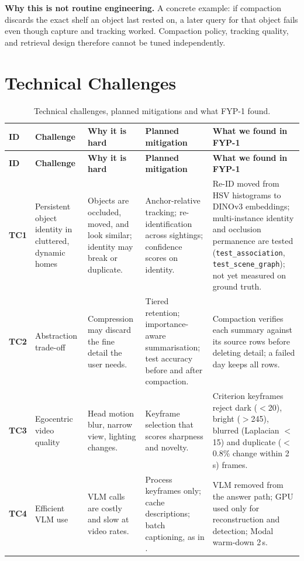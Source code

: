 \textbf{Why this is not routine engineering.} A concrete example: if compaction
discards the exact shelf an object last rested on, a later query for that
object fails even though capture and tracking worked. Compaction policy,
tracking quality, and retrieval design therefore cannot be tuned independently.
\section{Technical Challenges}
\begin{ltab}\scriptsize
\begin{longtable}{@{}>{\bfseries}L{0.9cm}L{2.3cm}L{3.7cm}L{3.7cm}L{3.7cm}@{}}
\caption{Technical challenges, planned mitigations and what FYP-1 found.}\label{tab:challenges}\\
\toprule
{}\textbf{ID} & \textbf{Challenge} & \textbf{Why it is hard} &
\textbf{Planned mitigation} & \textbf{What we found in FYP-1}\\
\midrule
\endfirsthead
\toprule
{}\textbf{ID} & \textbf{Challenge} & \textbf{Why it is hard} &
\textbf{Planned mitigation} & \textbf{What we found in FYP-1}\\
\midrule
\endhead
\bottomrule
\endfoot
TC1 & Persistent object identity in cluttered, dynamic homes & Objects are
occluded, moved, and look similar; identity may break or duplicate. &
Anchor-relative tracking; re-identification across sightings; confidence scores
on identity. & Re-ID moved from HSV histograms to DINOv3 embeddings; multi-instance identity and occlusion permanence are tested (\texttt{test\_association}, \texttt{test\_scene\_graph}); not yet measured on ground truth.\\
TC2 & Abstraction trade-off & Compression may discard the fine detail the user
needs. & Tiered retention; importance-aware summarisation; test accuracy
before and after compaction. & Compaction verifies each summary against its source rows before deleting detail; a failed day keeps all rows.\\
TC3 & Egocentric video quality & Head motion blur, narrow view, lighting
changes. & Keyframe selection that scores sharpness and novelty. & Criterion keyframes reject dark ($<$20), bright ($>$245), blurred (Laplacian $<$15) and duplicate ($<$0.8\% change within 2\,s) frames.\\
TC4 & Efficient VLM use & VLM calls are costly and slow at video rates. &
Process keyframes only; cache descriptions; batch captioning, as in
\cite{daaam2026}. & VLM removed from the answer path; GPU used only for reconstruction and detection; Modal warm-down 2\,s.\\

\end{longtable}
\end{ltab}
